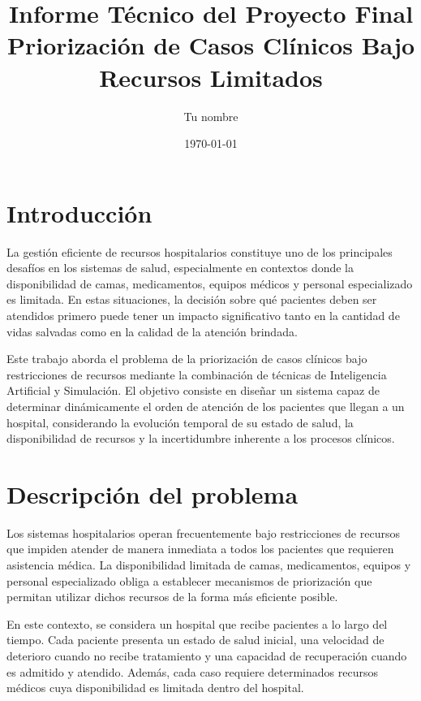 \documentclass[12pt,a4paper]{article}
\title{Informe Técnico del Proyecto Final\\\large Priorización de Casos Clínicos Bajo Recursos Limitados}
\author{Tu nombre}
\date{\today}
\begin{document}
\maketitle
\tableofcontents
\newpage

\section{Introducción}

La gestión eficiente de recursos hospitalarios constituye uno de los principales desafíos en los sistemas de salud, 
especialmente en contextos donde la disponibilidad de camas, medicamentos, equipos médicos y personal especializado es limitada. 
En estas situaciones, la decisión sobre qué pacientes deben ser atendidos primero puede tener un impacto significativo tanto 
en la cantidad de vidas salvadas como en la calidad de la atención brindada.

Este trabajo aborda el problema de la priorización de casos clínicos bajo restricciones de recursos mediante 
la combinación de técnicas de Inteligencia Artificial y Simulación. 
El objetivo consiste en diseñar un sistema capaz de determinar dinámicamente el orden de atención de los pacientes 
que llegan a un hospital, considerando la evolución temporal de su estado de salud, la disponibilidad de recursos y 
la incertidumbre inherente a los procesos clínicos.

\section{Descripción del problema}

Los sistemas hospitalarios operan frecuentemente bajo restricciones de recursos que impiden atender de manera inmediata a 
todos los pacientes que requieren asistencia médica. 
La disponibilidad limitada de camas, medicamentos, equipos y personal especializado obliga a establecer 
mecanismos de priorización que permitan utilizar dichos recursos de la forma más eficiente posible.

En este contexto, se considera un hospital que recibe pacientes a lo largo del tiempo. 
Cada paciente presenta un estado de salud inicial, una velocidad de deterioro cuando no recibe tratamiento y 
una capacidad de recuperación cuando es admitido y atendido. 
Además, cada caso requiere determinados recursos médicos cuya disponibilidad es limitada dentro del hospital.
\end{document}
